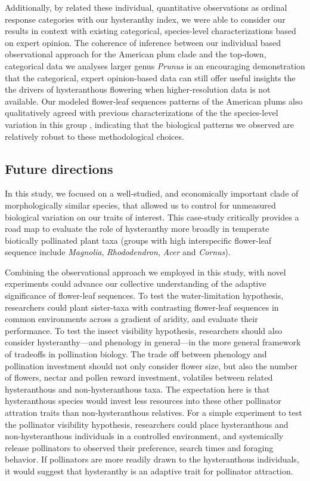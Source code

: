 \documentclass{article}[11pt]
\begin{document}
{Additionally, by related these individual, quantitative observations as ordinal response categories with our hysteranthy index, we were able to consider our results in context with existing categorical, species-level characterizations based on expert opinion. The coherence of inference between our individual based observational approach for the American plum clade and the top-down, categorical data we analyses larger genus \emph{Prunus} is an encouraging demonstration that the categorical, expert opinion-based data can still offer useful insights the the drivers of hysteranthous flowering when higher-resolution data is not available. Our modeled flower-leaf sequences patterns of the American plums also qualitatively agreed with previous characterizations of the the species-level variation in this group \citep{Shaw:2004aa}, indicating that the biological patterns we observed are relatively robust to these methodological choices.

\subsection*{Future directions}

In this study, we focused on a well-studied, and economically important clade of morphologically similar species, that allowed us to control for unmeasured biological variation on our traits of interest. This case-study critically provides a road map to evaluate the role of hysteranthy more broadly in temperate biotically pollinated plant taxa (groups with high interspecific flower-leaf sequence include \emph{Magnolia}, \emph{Rhododendron}, \emph{Acer} and \emph{Cornus}). 

Combining the observational approach we employed in this study, with novel experiments could advance our collective understanding of the adaptive significance of flower-leaf sequences. To test the water-limitation hypothesis, researchers could plant sister-taxa with contrasting flower-leaf sequences in common environments across a gradient of aridity, and evaluate their performance. To test the insect visibility hypothesis, researchers should also consider hysteranthy---and phenology in general---in the more general framework of tradeoffs in pollination biology. The trade off between phenology and pollination investment should not only consider flower size, but also the number of flowers, nectar and pollen reward investment, volatiles between related hysteranthous and non-hysteranthous taxa. The expectation here is that hysteranthous species would invest less resources into these other pollinator attration traits than non-hysteranthous relatives. For a simple experiment to test the pollinator visibility hypothesis, researchers could place hysteranthous and non-hysteranthous individuals in a controlled environment, and systemically release pollinators to observed their preference, search times and foraging behavior. If pollinators are more readily drawn to the hysteranthous individuals, it would suggest that hysteranthy is an adaptive trait for pollinator attraction.

}
\end{document}
